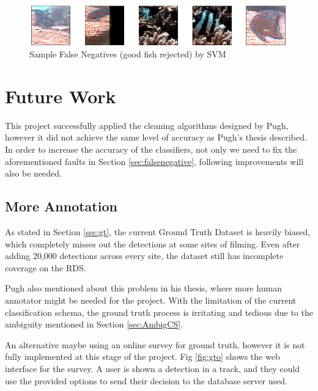 \documentclass[bsc,logo,twoside,fullspacing,parskip]{infthesis}
\begin{document}
\begin{figure}[h]
    \centering
    \includegraphics[scale=0.40]{graph/SVMfail.png}
    \caption{Sample False Negatives (good fish rejected) by SVM}
    \label{fig:SVMfail}
\end{figure}

\section{Future Work}
\label{sec:future}

This project successfully applied the cleaning algorithms designed by Pugh\cite{Pugh}, however it did not achieve the same level of accuracy as Pugh's thesis described.
In order to increase the accuracy of the classifiers, not only we need to fix the aforementioned faults in Section \ref{sec:falsenegative}, following improvements will also be needed.

\subsection{More Annotation}

As stated in Section \ref{sec:gt}, the current Ground Truth Dataset is heavily biased, which completely misses out the detections at some sites of filming. 
Even after adding 20,000 detections across every site, the dataset still has incomplete coverage on the RDS. 

Pugh also mentioned about this problem in his thesis, where more human annotator might be needed for the project.
With the limitation of the current classification schema, the ground truth process is irritating and tedious due to the ambiguity mentioned in Section \ref{sec:AmbigCS}.

An alternative maybe using an online survey for ground truth, however it is not fully implemented at this stage of the project. 
Fig \ref{fig:gto} shows the web interface for the survey.
A user is shown a detection in a track, and they could use the provided options to send their decision to the database server used.
\end{document}
